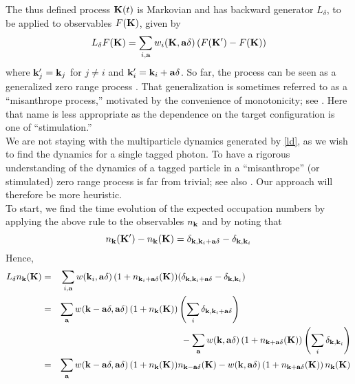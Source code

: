 \documentclass[a4paper,12pt,reqno,superscriptaddress,nofootinbib]{revtex4}
\newcommand{\0}{^{(0)}}
\newcommand{\1}{^{(1)}}
\newcommand{\2}{^{(2)}}
\begin{document}
The thus defined process $\vb{K}(t)$ is Markovian and has backward generator $L_\delta$, to be applied to observables
$F(\vb{K})$, given by
\begin{equation}\label{ld}
L_\delta F(\vb{K})= \sum_{i,\vb{a}} w_i(\vb{K},\vb{a}\delta) \left(F(\vb{K}') 
-F(\vb{K})\right)
\end{equation}
where $\vb{k}'_j = \vb{k}_j$ for $j \neq i$ and 
$\vb{k}'_i = \vb{k}_i + \vb{a} \delta$.
So far, the process can be seen as a generalized zero range process \cite{blythe}.  That generalization is sometimes referred to as a ``misanthrope process,'' motivated by the convenience of monotonicity; see \cite{cocozza,sethuraman}.  Here that name is less appropriate as the dependence on the target configuration is one of ``stimulation.'' \\
We are not staying with the multiparticle dynamics generated by \eqref{ld}, as we wish to find the dynamics for a single tagged photon.  To have a rigorous understanding of the dynamics of a tagged particle in a ``misanthrope'' (or stimulated) zero range process is far from trivial; see also \cite{jara}.  Our approach will therefore be more heuristic.\\


To start, we find the time evolution of the expected occupation numbers by applying the above rule to the observables
$n_{\vb{k}}$ and by noting that  \[ n_{\vb{k}}(\vb{K}') - n_{\vb{k}}(\vb{K}) = \delta_{\vb{k},\vb{k}_i + \vb{a} 
	\delta} - \delta_{\vb{k},\vb{k}_i} \]
Hence,
\begin{alignat}{3}
L_\delta n_{\vb{k}} (\vb{K}) &=& \sum_{i,\vb{a}} w(\vb{k}_i,\vb{a}\delta) \left(1 + 
n_{\vb{k}_i+ \vb{a}\delta}(\vb{K}) \right)& (\delta_{\vb{k},\vb{k}_i + \vb{a} 
	\delta} - \delta_{\vb{k},\vb{k}_i} )\nonumber\\
&=& \sum_{\vb{a}} w( \vb{k} - \vb{a}\delta, \vb{a}\delta)
\left(1 + n_{\vb{k}}(\vb{K}) \right) &\left(\sum_i \delta_{\vb{k},\vb{k}_i + 
	\vb{a} \delta}\right) \nonumber\\
&& & \  -  \sum_{\vb{a}} w(\vb{k}, \vb{a} \delta) \left(1 + n_{\vb{k}+ \vb{a}\delta}(\vb{K}) 
\right) \left(\sum_i \delta_{\vb{k},\vb{k}_i} \right)\nonumber\\
&=& \sum_{\vb{a}}  w( \vb{k} - \vb{a}\delta, \vb{a}\delta)
\left(1 + n_{\vb{k}}(\vb{K}) \right)& n_{\vb{k} - \vb{a} \delta}(\vb{K}) - w(\vb{k}, \vb{a} \delta) \left(1 + n_{\vb{k}+ \vb{a}\delta}(\vb{K}) 
\right) n_{\vb{k}}(\vb{K})\label{deln}
\end{alignat}
\end{document}
